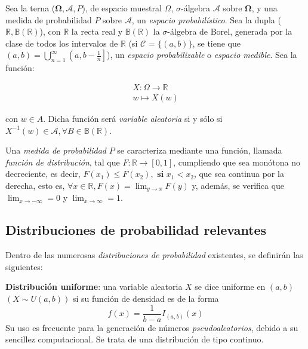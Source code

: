 Sea la terna ($\mathbf{\Omega}, \mathscr{A}, P$), de espacio muestral $\Omega$, $\sigma$-álgebra $\mathscr{A}$ sobre $\mathbf{\Omega}$, y una medida de probabilidad $P$ sobre $\mathscr{A}$, un {\sl espacio probabilístico}. Sea la dupla ($\mathbb{R}, \mathbb{B(\mathbb{R})}$), con $\mathbb{R}$ la recta real y $\mathbb{B(\mathbb{R})}$ la $\sigma$-álgebra de Borel, generada por la clase de todos los intervalos de $\mathbb{R}$ (si $\mathscr{C}$ = $\{(a, b)\}$, se tiene que $(a, b) = \displaystyle\bigcup_{n=1}^{\infty} \left(a, b - \frac{1}{n}\right]$), un {\sl espacio probabilizable} o {\sl espacio medible}. Sea la función:

\begin{equation*}
\begin{split}
    X : \Omega \rightarrow{\mathbb{R}} \\
    w \mapsto X(w)
\end{split}
\end{equation*}

con $w \in A$. Dicha función será {\sl variable aleatoria} si y sólo si $X^{-1}(w) \in \mathscr{A}, \forall B \in \mathbb{B(\mathbb{R})}$.

Una {\sl medida de probabilidad} $P$ se caracteriza mediante una función, llamada {\sl función de distribución}, tal que $F : \mathbb{R} \rightarrow{\left[0,1\right]}$, cumpliendo que sea monótona no decreciente, es decir, $F(x_1) \leq F(x_2), \textbf{ si }x_1 < x_2$, que sea continua por la derecha, esto es, $\forall x \in \mathbb{R}, F(x) = \displaystyle\lim_{y \to x} F(y)$ y, además, se verifica que$\displaystyle\lim_{x \to -\infty} = 0$ y $ \displaystyle\lim_{x \to \infty} = 1$.

\subsection{Distribuciones de probabilidad relevantes}
Dentro de las numerosas {\sl distribuciones de probabilidad} existentes, se definirán las siguientes:

{\bf Distribución uniforme}: una variable aleatoria $X$ se dice uniforme en $\left(a, b\right)$ $\left(X \sim U\left(a, b\right)\right)$ si su {función de densidad} es de la forma
\begin{equation*}
    f(x) = \dfrac{1}{b-a}I_{\left(a, b\right)}(x)
\end{equation*}
Su uso es frecuente para la generación de números {\sl pseudoaleatorios}, debido a su sencillez computacional. Se trata de una distribución de tipo continuo.

